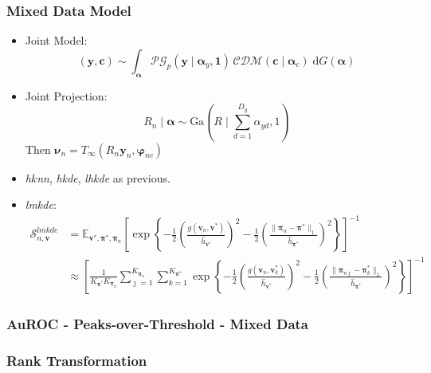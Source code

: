 \documentclass[aspectratio=169,10pt]{beamer}
\begin{document}
\begin{frame}
    \frametitle{Mixed Data Model}
    {\small 
    \begin{itemize}
        \item Joint Model:
        \[
        (\bm{y},\bm{c}) \sim \int_{\bm{\alpha}}
            \mathcal{PG}_p(\bm{y}\mid\bm{\alpha}_y,\bm{1})\,
            \mathcal{CDM}(\bm{c}\mid\bm{\alpha}_c)\;\text{d}G(\bm{\alpha})
        \]
        \item Joint Projection:
        \[
            R_n \mid \bm{\alpha} \sim \text{Ga}\left(R\mid\sum_{d = 1}^{D_y} \alpha_{yd}, 1\right)
        \]
        Then $\bm{\nu}_n = T_{\infty}(R_n\bm{y}_n,\bm{\varphi}_{nc})$
        \item \emph{h$k$nn}, \emph{hkde}, \emph{lhkde} as previous.
        \item \emph{lmkde}:
        \[
        \begin{aligned}
            \mathcal{S}_{n,\bm{v}}^{lmkde} &= \mathbb{E}_{\bm{v}^*,\bm{\pi}^*,\bm{\pi}_n}\left[
        \exp
        \left\lbrace 
        -\frac{1}{2}
        \left(
        \frac{g\left(\bm{v}_n, \bm{v}^*\right)}{\hat{h}_{\bm{v}^*}}
        \right)^2
        -\frac{1}{2}
        \left(
        \frac{\lVert\bm{\pi}_n - \bm{\pi}^*\rVert_1}{\hat{h}_{\bm{\pi}^*}}
        \right)^2
        \right\rbrace
        \right]^{-1}\\
        &\approx \left[\frac{1}{K_{\bm{\pi}^*}K_{\bm{\pi}_n}}
            \sum_{\jmath = 1}^{K_{\bm{\pi}_n}}\sum_{k=1}^{K_{\bm{\pi}^*}}
            \exp\left\lbrace-\frac{1}{2}
            \left(\frac{g(\bm{v}_n,\bm{v}_k^*)}{\hat{h}_{\bm{v}^*}}\right)^2
            -\frac{1}{2}\left(
            \frac{\lVert\bm{\pi}_{n\jmath} - \bm{\pi}_k^*\rVert_1}{\hat{h}_{\bm{\pi}^*}}
            \right)^2
            \right\rbrace\right]^{-1}
        \end{aligned}
        \]
    \end{itemize}
    }
\end{frame} %

\begin{frame}
    \frametitle{AuROC - Peaks-over-Threshold - Mixed Data}
    \begin{table}
        \centering
        
    \end{table}
\end{frame} %

\subsubsection{Rank Transformation}
\end{document}
